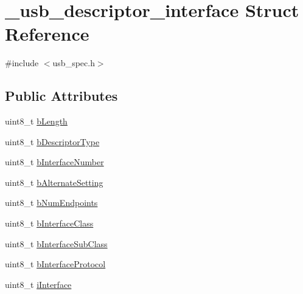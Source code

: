 \hypertarget{struct__usb__descriptor__interface}{\section{\-\_\-usb\-\_\-descriptor\-\_\-interface Struct Reference}
\label{struct__usb__descriptor__interface}
}


{\ttfamily \#include $<$usb\-\_\-spec.\-h$>$}

\subsection*{Public Attributes}
\begin{DoxyCompactItemize}
\item 
uint8\-\_\-t \hyperlink{struct__usb__descriptor__interface_ab868f973079056f9794c5b7088656a11}{b\-Length}
\item 
uint8\-\_\-t \hyperlink{struct__usb__descriptor__interface_a11582093f5a71f82e7d0b8737dc819ca}{b\-Descriptor\-Type}
\item 
uint8\-\_\-t \hyperlink{struct__usb__descriptor__interface_aaf82868fa9b16bc2535509c9d13dfc03}{b\-Interface\-Number}
\item 
uint8\-\_\-t \hyperlink{struct__usb__descriptor__interface_ac92284f782ac2bacc57b831704661afc}{b\-Alternate\-Setting}
\item 
uint8\-\_\-t \hyperlink{struct__usb__descriptor__interface_a92c2c6831a9ea667c11adc19818ed125}{b\-Num\-Endpoints}
\item 
uint8\-\_\-t \hyperlink{struct__usb__descriptor__interface_abf389f0aec2ea06668c462cfa2369f53}{b\-Interface\-Class}
\item 
uint8\-\_\-t \hyperlink{struct__usb__descriptor__interface_a07e53d402220a683ea7829264336c2f1}{b\-Interface\-Sub\-Class}
\item 
uint8\-\_\-t \hyperlink{struct__usb__descriptor__interface_a68c1bf12013a7874840a7d7f1be88657}{b\-Interface\-Protocol}
\item 
uint8\-\_\-t \hyperlink{struct__usb__descriptor__interface_acbe1bce5e0dab87025d4e59ec2ed8780}{i\-Interface}
\end{DoxyCompactItemize}


